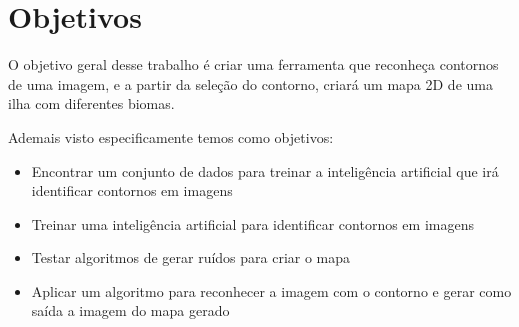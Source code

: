 \section{Objetivos}

O objetivo geral desse trabalho é criar uma ferramenta que reconheça contornos de uma imagem, e a partir da seleção do contorno, criará um mapa 2D de uma ilha com diferentes biomas.

Ademais visto especificamente temos como objetivos:

\begin{itemize}
	\item Encontrar um conjunto de dados para treinar a inteligência artificial que irá identificar contornos em imagens
	\item Treinar uma inteligência artificial para identificar contornos em imagens
	\item Testar algoritmos de gerar ruídos para criar o mapa
	\item Aplicar um algoritmo para reconhecer a imagem com o contorno e gerar como saída a imagem do mapa gerado
\end{itemize}

